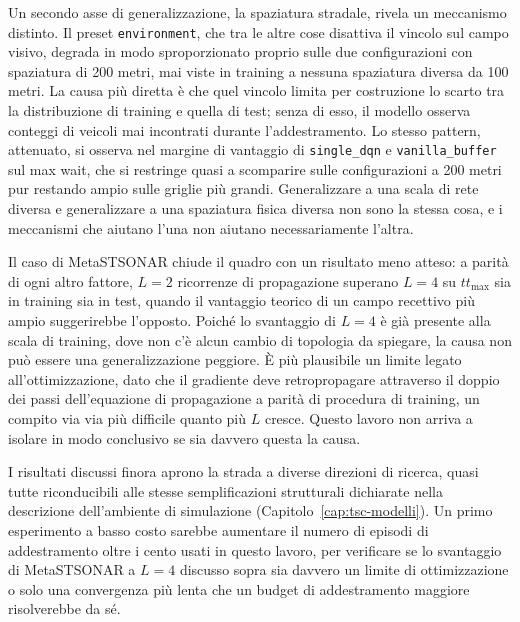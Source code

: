 Un secondo asse di generalizzazione, la spaziatura stradale, rivela un
meccanismo distinto. Il preset \texttt{environment}, che tra le altre cose
disattiva il vincolo sul campo visivo, degrada in modo sproporzionato
proprio sulle due configurazioni con spaziatura di 200 metri, mai viste in
training a nessuna spaziatura diversa da 100 metri. La causa più diretta è
che quel vincolo limita per costruzione lo scarto tra la distribuzione di
training e quella di test; senza di esso, il modello osserva conteggi di
veicoli mai incontrati durante l'addestramento. Lo stesso pattern,
attenuato, si osserva nel margine di vantaggio di \texttt{single\_dqn} e
\texttt{vanilla\_buffer} sul max wait, che si restringe quasi a scomparire
sulle configurazioni a 200 metri pur restando ampio sulle griglie più
grandi. Generalizzare a una scala di rete diversa e generalizzare a una
spaziatura fisica diversa non sono la stessa cosa, e i meccanismi che
aiutano l'una non aiutano necessariamente l'altra.

Il caso di MetaSTSONAR chiude il quadro con un risultato meno atteso: a
parità di ogni altro fattore, $L=2$ ricorrenze di propagazione superano
$L=4$ su $tt_{\max}$ sia in training sia in test, quando il vantaggio
teorico di un campo recettivo più ampio suggerirebbe l'opposto. Poiché lo
svantaggio di $L=4$ è già presente alla scala di training, dove non c'è
alcun cambio di topologia da spiegare, la causa non può essere una
generalizzazione peggiore. È più plausibile un limite legato
all'ottimizzazione, dato che il gradiente deve retropropagare attraverso
il doppio dei passi dell'equazione di propagazione a parità di procedura
di training, un compito via via più difficile quanto più $L$ cresce.
Questo lavoro non arriva a isolare in modo conclusivo se sia davvero
questa la causa.

I risultati discussi finora aprono la strada a diverse direzioni di
ricerca, quasi tutte riconducibili alle stesse semplificazioni strutturali
dichiarate nella descrizione dell'ambiente di simulazione
(Capitolo~\ref{cap:tsc-modelli}). Un primo esperimento a basso costo
sarebbe aumentare il numero di episodi di addestramento oltre i cento
usati in questo lavoro, per verificare se lo svantaggio di MetaSTSONAR a
$L=4$ discusso sopra sia davvero un limite di ottimizzazione o solo una
convergenza più lenta che un budget di addestramento maggiore
risolverebbe da sé.

